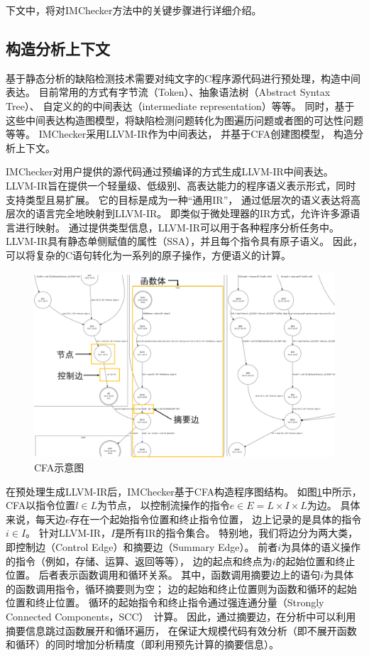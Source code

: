 下文中，将对IMChecker方法中的关键步骤进行详细介绍。

\subsection{构造分析上下文}
基于静态分析的缺陷检测技术需要对纯文字的C程序源代码进行预处理，构造中间表达。
目前常用的方式有字节流（Token）、抽象语法树（Abstract Syntax Tree）、
自定义的的中间表达（intermediate representation）等等。
同时，基于这些中间表达构造图模型，将缺陷检测问题转化为图遍历问题或者图的可达性问题等等。
IMChecker采用LLVM-IR作为中间表达，
并基于CFA创建图模型，
构造分析上下文。

IMChecker对用户提供的源代码通过预编译的方式生成LLVM-IR中间表达。
LLVM-IR旨在提供一个轻量级、低级别、高表达能力的程序语义表示形式，同时支持类型且易扩展。
它的目标是成为一种“通用IR”，
通过低层次的语义表达将高层次的语言完全地映射到LLVM-IR。
即类似于微处理器的IR方式，允许许多源语言进行映射。
通过提供类型信息，LLVM-IR可以用于各种程序分析任务中。
LLVM-IR具有静态单侧赋值的属性（SSA），并且每个指令具有原子语义。
因此，可以将复杂的C语句转化为一系列的原子操作，方便语义的计算。

\begin{figure}[t]
	\centering
	\includegraphics[width=0.7\linewidth]{figures/cp3-3-cfa.png}
	\caption{
		CFA示意图
	}
	\label{fig:3-3-cfa}
\end{figure}

在预处理生成LLVM-IR后，IMChecker基于CFA构造程序图结构。
如图\ref{fig:3-3-cfa}中所示，CFA以指令位置$l \in L$为节点，
以控制流操作的指令$e \in E = L \times I \times L$为边。
具体来说，每天边$e$存在一个起始指令位置和终止指令位置，
边上记录的是具体的指令$i \in I$。
针对LLVM-IR，$I$是所有IR的指令集合。
特别地，我们将边分为两大类，即控制边（Control Edge）和摘要边（Summary Edge）。
前者$i$为具体的语义操作的指令（例如，存储、运算、返回等等），
边的起点和终点为$i$的起始位置和终止位置。
后者表示函数调用和循环关系。
其中，函数调用摘要边上的语句$i$为具体的函数调用指令，循环摘要则为空；
边的起始和终止位置则为函数和循环的起始位置和终止位置。
循环的起始指令和终止指令通过强连通分量（Strongly Connected Components，SCC）~\cite{12-ele-scc}计算。
因此，通过摘要边，在分析中可以利用摘要信息跳过函数展开和循环遍历，
在保证大规模代码有效分析（即不展开函数和循环）的同时增加分析精度（即利用预先计算的摘要信息）。


